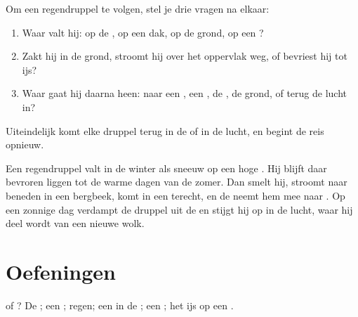 \begin{method}\label{met:g2:water-on-earth:drop}
Om een regendruppel te volgen, stel je drie vragen na elkaar:
\begin{enumerate}
  \item Waar valt hij: op de , op een dak, op de grond, op een ?
  \item Zakt hij in de grond, stroomt hij over het oppervlak weg, of
        bevriest hij tot ijs?
  \item Waar gaat hij daarna heen: naar een , een , de , de
        grond, of terug de lucht in?
\end{enumerate}
Uiteindelijk komt elke druppel terug in de  of in de lucht, en begint
de reis opnieuw.
\end{method}

\begin{example}\label{ex:g2:water-on-earth:mountain}
Een regendruppel valt in de winter als sneeuw op een hoge . Hij blijft
daar bevroren liggen tot de warme dagen van de zomer. Dan smelt hij,
stroomt naar beneden in een bergbeek, komt in een  terecht, en de
 neemt hem mee naar . Op een zonnige dag verdampt de druppel uit
de  en stijgt hij op in de lucht, waar hij deel wordt van een nieuwe
wolk.
\end{example}

\section{Oefeningen}

\begin{exercise}[$\star$]\label{exo:g2:water-on-earth:1}
 of ? De ; een ; regen; een  in de
; een ; het ijs op een .
\end{exercise}

